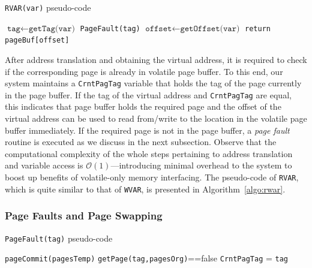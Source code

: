 \begin{algorithm}[t]
	\caption{\texttt{RVAR(var)} pseudo-code}
	\label{algo:rwar}
	\scriptsize
	\begin{algorithmic}[1]
		\State $\texttt{tag}\leftarrow \texttt{getTag(var)}$ 
			
		\State	\texttt{PageFault(tag)} 
		\EndIf
				\State $\texttt{offset}\leftarrow \texttt{getOffset(var)}$ 		
		\State \texttt{return pageBuf[offset]}  
	\end{algorithmic}
\end{algorithm}

After address translation and obtaining the virtual address, it is required to check if the corresponding page is already in volatile page buffer. To this end, our system maintains a \texttt{CrntPagTag} variable that holds the tag of the page currently in the page buffer. If the tag of the virtual address and \texttt{CrntPagTag} are equal, this indicates that page buffer holds the required page and the offset of the virtual address can be used to read from/write to the location in the volatile page buffer immediately. If the required page is not in the page buffer, a \emph{page fault} routine is executed as we discuss in the next subsection. Observe that the computational complexity of the whole steps pertaining to address translation and variable access is $\mathcal{O}(1)$---introducing minimal overhead to the system to boost up benefits of volatile-only memory interfacing. The pseudo-code of \texttt{RVAR}, which is quite similar to that of \texttt{WVAR}, is presented in Algorithm~\ref{algo:rwar}.

\subsubsection{Page Faults and Page Swapping}

\begin{algorithm}[t]
	\caption{\texttt{PageFault(tag)} pseudo-code}
	\label{algo:pagefault}
	\scriptsize
	\begin{algorithmic}[1]
			
		\State \texttt{pageCommit(pagesTemp)} 
		\EndIf
		 
		 
		\Else
		\State \texttt{getPage(tag,pagesOrg)}==false 
		\EndIf 
		\State \texttt{CrntPagTag} = \texttt{tag} 
	\end{algorithmic}
\end{algorithm}


